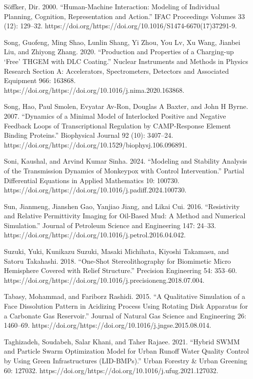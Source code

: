 \documentclass[utf8]{gradu3}
\begin{document}
Söffker, Dir. 2000. “Human-Machine Interaction: Modeling of Individual Planning, Cognition, Representation and Action.” IFAC Proceedings Volumes 33 (12): 129–32. https://doi.org/https://doi.org/10.1016/S1474-6670(17)37291-9.

Song, Guofeng, Ming Shao, Lunlin Shang, Yi Zhou, You Lv, Xu Wang, Jianbei Liu, and Zhiyong Zhang. 2020. “Production and Properties of a Charging-up ‘Free’ THGEM with DLC Coating.” Nuclear Instruments and Methods in Physics Research Section A: Accelerators, Spectrometers, Detectors and Associated Equipment 966: 163868. https://doi.org/https://doi.org/10.1016/j.nima.2020.163868.

Song, Hao, Paul Smolen, Evyatar Av-Ron, Douglas A Baxter, and John H Byrne. 2007. “Dynamics of a Minimal Model of Interlocked Positive and Negative Feedback Loops of Transcriptional Regulation by CAMP-Response Element Binding Proteins.” Biophysical Journal 92 (10): 3407–24. https://doi.org/https://doi.org/10.1529/biophysj.106.096891.

Soni, Kaushal, and Arvind Kumar Sinha. 2024. “Modeling and Stability Analysis of the Transmission Dynamics of Monkeypox with Control Intervention.” Partial Differential Equations in Applied Mathematics 10: 100730. https://doi.org/https://doi.org/10.1016/j.padiff.2024.100730.

Sun, Jianmeng, Jianshen Gao, Yanjiao Jiang, and Likai Cui. 2016. “Resistivity and Relative Permittivity Imaging for Oil-Based Mud: A Method and Numerical Simulation.” Journal of Petroleum Science and Engineering 147: 24–33. https://doi.org/https://doi.org/10.1016/j.petrol.2016.04.042.

Suzuki, Yuki, Kunikazu Suzuki, Masaki Michihata, Kiyoshi Takamasu, and Satoru Takahashi. 2018. “One-Shot Stereolithography for Biomimetic Micro Hemisphere Covered with Relief Structure.” Precision Engineering 54: 353–60. https://doi.org/https://doi.org/10.1016/j.precisioneng.2018.07.004.

Tabasy, Mohammad, and Fariborz Rashidi. 2015. “A Qualitative Simulation of a Face Dissolution Pattern in Acidizing Process Using Rotating Disk Apparatus for a Carbonate Gas Reservoir.” Journal of Natural Gas Science and Engineering 26: 1460–69. https://doi.org/https://doi.org/10.1016/j.jngse.2015.08.014.

Taghizadeh, Soudabeh, Salar Khani, and Taher Rajaee. 2021. “Hybrid SWMM and Particle Swarm Optimization Model for Urban Runoff Water Quality Control by Using Green Infrastructures (LID-BMPs).” Urban Forestry \& Urban Greening 60: 127032. https://doi.org/https://doi.org/10.1016/j.ufug.2021.127032.
\end{document}
